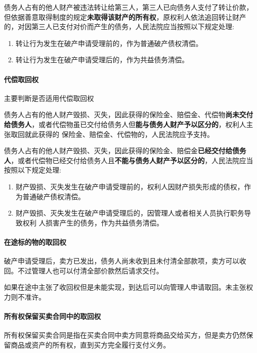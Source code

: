 \documentclass[UTF8,12pt]{ctexart}
\numberwithin{equation}{section} %
\numberwithin{figure}{section}
\numberwithin{table}{section}
\begin{document}
	债务人占有的他人财产被违法转让给第三人，第三人已向债务人支付了转让价款，但依据善意取得制度的规定\textbf{未取得该财产的所有权}，原权利人依法追回转让财产的，对因第三人已支付对价而产生的债务，人民法院应当按照以下规定处理:
	\begin{enumerate}
		\item 转让行为发生在破产申请受理前的，作为普通破产债权清偿。
		
		\item 转让行为发生在破产申请受理后的，作为共益债务清偿。
	\end{enumerate}
	
	
	\paragraph{代偿取回权}
	主要判断是否适用代偿取回权
	
	债务人占有的他人财产毁损、灭失，因此获得的保险金、赔偿金、代偿物\textbf{尚未交付给债务人}，或者代偿物虽已交付给债务人但\textbf{能与债务人财产予以区分的}，权利人主张取回就此获得的 保险金、赔偿金、代偿物的，人民法院应予支持。
	
	
	债务人占有的他人财产毁损、灭失，因此获得的保险金、赔偿金\textbf{已经交付给债务人}，或者代偿物已经交付给债务人且\textbf{不能与债务人财产予以区分的}，人民法院应当按照以下规定处理: 
	\begin{enumerate}
		\item 财产毁损、灭失发生在破产申请受理前的，权利人因财产损失形成的债权，作为普通破产债权清偿。
		
		\item 财产毁损、灭失发生在破产申请受理后的，因管理人或者相关人员执行职务导致权利 人损害产生的债务，作为共益债务清偿。
	\end{enumerate}
	
	
	\paragraph{在途标的物的取回权}
	破产申请受理后，卖方已发出，债务人尚未收到且未付清全部款项，卖方可以收回。不过管理人也可以付清全部价款然后请求交付。
	
	如果在途中主张了收回权但是未能实现，到达后可以向管理人申请取回。未主张权力则不准许。
	
	\paragraph{所有权保留买卖合同中的取回权}
	所有权保留买卖合同是指在买卖合同中卖方同意将商品交给买方，但是卖方仍然保留商品或资产的所有权，直到买方完全履行支付义务。
	
\end{document}
